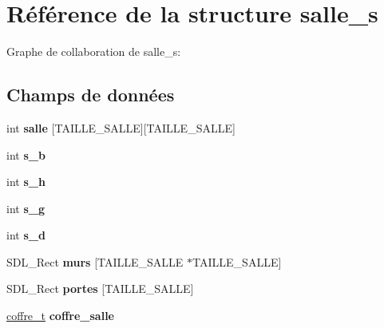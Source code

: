 \hypertarget{structsalle__s}{}\section{Référence de la structure salle\+\_\+s}
\label{structsalle__s}


Graphe de collaboration de salle\+\_\+s\+:
\subsection*{Champs de données}
\begin{DoxyCompactItemize}
\item 
\mbox{\label{structsalle__s_a3c48c122acb80d4684fd041173ee4195}} 
int {\bfseries salle} \mbox{[}T\+A\+I\+L\+L\+E\+\_\+\+S\+A\+L\+LE\mbox{]}\mbox{[}T\+A\+I\+L\+L\+E\+\_\+\+S\+A\+L\+LE\mbox{]}
\item 
\mbox{\label{structsalle__s_ae8f4e68ca96cca0cc8cb0c44b9805871}} 
int {\bfseries s\+\_\+b}
\item 
\mbox{\label{structsalle__s_a3fb686926092e66e6f50f13af338fcde}} 
int {\bfseries s\+\_\+h}
\item 
\mbox{\label{structsalle__s_ae18bd958f7d719a0cbd50275d631c5cd}} 
int {\bfseries s\+\_\+g}
\item 
\mbox{\label{structsalle__s_a3ef26730b1c30dbcc820160dc2d7235a}} 
int {\bfseries s\+\_\+d}
\item 
\mbox{\label{structsalle__s_a39419b64ed1a04c7252e8319e3b8e328}} 
S\+D\+L\+\_\+\+Rect {\bfseries murs} \mbox{[}T\+A\+I\+L\+L\+E\+\_\+\+S\+A\+L\+LE $\ast$T\+A\+I\+L\+L\+E\+\_\+\+S\+A\+L\+LE\mbox{]}
\item 
\mbox{\label{structsalle__s_a00230727a6aa662cce254a0341c567f8}} 
S\+D\+L\+\_\+\+Rect {\bfseries portes} \mbox{[}T\+A\+I\+L\+L\+E\+\_\+\+S\+A\+L\+LE\mbox{]}
\item 
\mbox{\label{structsalle__s_a5fb521a3b003d43cefc74422e3ab63b9}} 
\hyperlink{structcoffre__t}{coffre\+\_\+t} {\bfseries coffre\+\_\+salle}
\item 

\end{DoxyCompactItemize}
